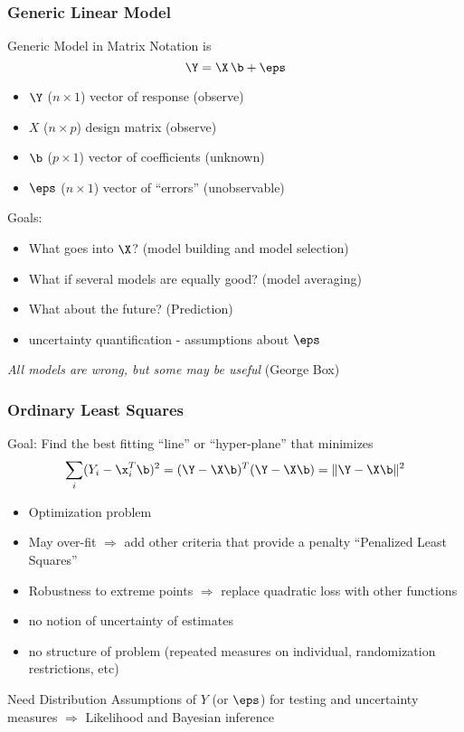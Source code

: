 \documentclass[handout]{beamer}
\begin{document}
\begin{frame}
  \frametitle{Generic Linear  Model}
  Generic Model in Matrix Notation is
$$
\Y  = \X \, \b + \eps  $$
\pause
\begin{itemize}
\item $\Y$ ($n \times 1$) vector of response   (observe)
\item $X$ ($n \times p$)  design matrix  (observe)
\item $\b$ ($p \times 1$) vector of coefficients  (unknown)
\item $\eps$ ($n \times 1$) vector of ``errors''  (unobservable)
\end{itemize} \pause

Goals: \pause
\begin{itemize}
\item What goes into $\X$?   (model building and model selection) \pause
\item What if several models are equally good?  (model averaging) \pause
\item What about the future?  (Prediction) \pause
\item uncertainty quantification - assumptions about $\eps$\pause
\end{itemize}
{\it All models are wrong, but some may be useful }  (George Box)
\end{frame}

\begin{frame}
  \frametitle{Ordinary Least Squares}
  Goal: Find the best fitting ``line'' or ``hyper-plane'' that
  minimizes
$$\sum_i  (Y_i - \x_i^T \b)^2 = (\Y - \X\b)^T(\Y - \X \b) = \| \Y -
\X\b \|^2 $$  \pause

\begin{itemize}
\item Optimization problem \pause
\item May over-fit $\Rightarrow$ add other criteria that provide a penalty
  ``Penalized Least Squares'' \pause
\item Robustness to extreme points $\Rightarrow$ replace quadratic
  loss with other functions  \pause
\item no notion of uncertainty of estimates  \pause
\item no structure of problem  (repeated measures on individual,
  randomization restrictions, etc)
\end{itemize}
Need  Distribution Assumptions of $Y$ (or $\eps$) for testing and
uncertainty measures \pause $\Rightarrow$ Likelihood  and Bayesian inference
\end{frame}
\end{document}
